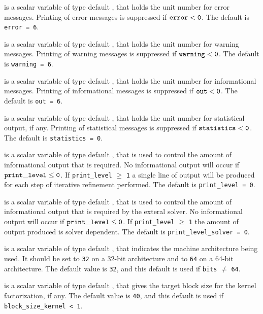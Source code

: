 \documentclass{galahad}
\begin{document}
\begin{description}

 is a scalar variable of type default \integer, that holds the
unit number for error messages.
Printing of error messages is suppressed if ${\tt error} < {\tt 0}$.
The default is {\tt error = 6}.

 is a scalar variable of type default \integer, that holds the
unit number for warning messages.
Printing of warning messages is suppressed if ${\tt warning} < {\tt 0}$.
The default is {\tt warning = 6}.

 is a scalar variable of type default \integer, that holds the
unit number for informational messages.
Printing of informational messages is suppressed if ${\tt out} < {\tt 0}$.
The default is {\tt out = 6}.

 is a scalar variable of type default \integer, that holds the
unit number for statistical output, if any.
Printing of statistical messages is suppressed if ${\tt statistics} < {\tt 0}$.
The default is {\tt statistics = 0}.

 is a scalar variable of type default \integer,
that is used
to control the amount of informational output that is required. No
informational output will occur if ${\tt print\_level} \leq {\tt 0}$. If
{\tt print\_level} $\geq$ {\tt 1} a single line of output will be produced
for each step of iterative refinement performed.
The default is {\tt print\_level = 0}.

 is a scalar variable of type default \integer,
that is used
to control the amount of informational output that is required by the exteral
solver. No
informational output will occur if ${\tt print\_level} \leq {\tt 0}$. If
{\tt print\_level} $\geq$ {\tt 1} the amount of output produced is solver
dependent.
The default is {\tt print\_level\_solver = 0}.

 is a scalar variable of type default \integer,
that indicates the machine architecture being used.
It should be set to {\tt 32} on a  32-bit architecture and to {\tt 64}
on a 64-bit architecture. The default value is {\tt 32},
and this default is used if {\tt bits} $\neq$ {\tt 64}.

 is a scalar variable of type default \integer,
that gives the target block size for the kernel factorization, if any.
The default value is {\tt 40},
and this default is used if {\tt block\_size\_kernel < 1}.


\end{description}
\end{document}
